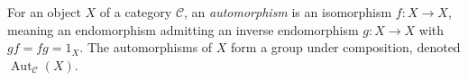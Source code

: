 
For an object $X$ of a category $\mathcal C$, an \emph{automorphism} is an isomorphism $f:X\to X$, meaning an endomorphism admitting an inverse endomorphism $g:X\to X$ with $gf=fg=1_X$. The automorphisms of $X$ form a group under composition, denoted $\operatorname{Aut}_{\mathcal C}(X)$.
